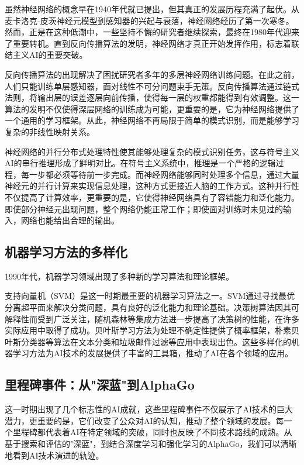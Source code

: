 虽然神经网络的概念早在1940年代就已提出，但其真正的发展历程充满了起伏。从麦卡洛克-皮茨神经元模型到感知器的兴起与衰落，神经网络经历了第一次寒冬。然而，正是在这种低潮中，一些坚持不懈的研究者继续探索，最终在1980年代迎来了重要转机。直到反向传播算法的发明，神经网络才真正开始发挥作用，标志着联结主义AI的重要突破。

反向传播算法的出现解决了困扰研究者多年的多层神经网络训练问题。在此之前，人们只能训练单层感知器，面对线性不可分问题束手无策。反向传播算法通过链式法则，将输出层的误差逐层向前传播，使得每一层的权重都能得到有效调整。这一算法的发明不仅使得深层网络的训练成为可能，更重要的是，它为神经网络提供了一个通用的学习框架。从此，神经网络不再局限于简单的模式识别，而是能够学习复杂的非线性映射关系。

神经网络的并行分布式处理特性使其能够处理复杂的模式识别任务，这与符号主义AI的串行推理形成了鲜明对比。在符号主义系统中，推理是一个严格的逻辑过程，每一步都必须等待前一步完成。而神经网络能够同时处理多个信息，通过大量神经元的并行计算来实现信息处理，这种方式更接近人脑的工作方式。这种并行性不仅提高了计算效率，更重要的是，它使得神经网络具有了容错能力和泛化能力。即使部分神经元出现问题，整个网络仍能正常工作；即使面对训练时未见过的输入，网络也能给出合理的输出。

\subsection{机器学习方法的多样化}

1990年代，机器学习领域出现了多种新的学习算法和理论框架。

支持向量机（SVM）是这一时期最重要的机器学习算法之一。SVM通过寻找最优分离超平面来解决分类问题，具有良好的泛化能力和理论基础。决策树算法因其可解释性而受到广泛关注，随机森林等集成方法进一步提高了决策树的性能，在许多实际应用中取得了成功。贝叶斯学习方法为处理不确定性提供了概率框架，朴素贝叶斯分类器等算法在文本分类和垃圾邮件过滤等应用中表现出色。这些多样化的机器学习方法为AI技术的发展提供了丰富的工具箱，推动了AI在各个领域的应用。

\subsection{里程碑事件：从"深蓝"到AlphaGo}

这一时期出现了几个标志性的AI成就，这些里程碑事件不仅展示了AI技术的巨大潜力，更重要的是，它们改变了公众对AI的认知，推动了整个领域的发展。每一个里程碑都代表着AI在特定领域的突破，同时也反映了不同技术路线的成熟。从基于搜索和评估的"深蓝"，到结合深度学习和强化学习的AlphaGo，我们可以清晰地看到AI技术演进的轨迹。

